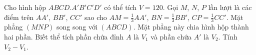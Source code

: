 \begin{bt}%
Cho hình hộp $ABCD.A'B'C'D'$ có thể tích $V=120$. Gọi $M$, $N$, $P$ lần lượt là các điểm trên $AA'$, $BB'$, $CC'$ sao cho $AM=\frac13 AA'$, $BN=\frac13 BB'$, $CP=\frac13 CC'$. Mặt phẳng $(MNP)$ song song với $(ABCD)$. Mặt phẳng này chia hình hộp thành hai phần. Biết thể tích phần chứa đỉnh $A$ là $V_1$ và phần chứa $A'$ là $V_2$. Tính $V_2-V_1$.

\end{bt}
